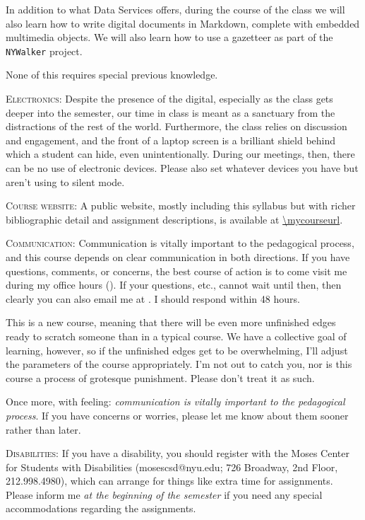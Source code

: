 \begin{description}
    In addition to what Data Services offers, during the course of the class we
    will also learn how to write digital documents in Markdown, complete with
    embedded multimedia objects. We will also learn how to use a gazetteer as
    part of the \texttt{NYWalker} project.

    None of this requires special previous knowledge.

  \item \textsc{Electronics:} Despite the presence of the digital, especially
    as the class gets deeper into the semester, our time in class is meant as a
    sanctuary from the distractions of the rest of the world. Furthermore, the
    class relies on discussion and engagement, and the front of a laptop screen
    is a brilliant shield behind which a student can hide, even
    unintentionally. During our meetings, then, there can be no use of
    electronic devices. Please also set whatever devices you have but aren’t
    using to silent mode.

  \item \textsc{Course website:} A public website, mostly including this
    syllabus but with richer bibliographic detail and assignment descriptions,
    is available at \url{\mycourseurl}.

  \item \textsc{Communication:} Communication is vitally important to the
    pedagogical process, and this course depends on clear communication in both
    directions. If you have questions, comments, or concerns, the best course
    of action is to come visit me during my office hours (\myofficehours). If
    your questions, etc., cannot wait until then, then clearly you can also
    email me at \texttt{\myemail}. I should respond within 48 hours.

    This is a new course, meaning that there will be even more unfinished edges
    ready to scratch someone than in a typical course. We have a collective
    goal of learning, however, so if the unfinished edges get to be
    overwhelming, I’ll adjust the parameters of the course appropriately. I’m
    not out to catch you, nor is this course a process of grotesque punishment.
    Please don’t treat it as such.

    Once more, with feeling: \textit{communication is vitally important to the
    pedagogical process}. If you have concerns or worries, please let me know
    about them sooner rather than later.

  \item \textsc{Disabilities:} If you have a disability, you should register
    with the Moses Center for Students with Disabilities (mosescsd@nyu.edu; 726
    Broadway, 2nd Floor, 212.998.4980), which can arrange for things like extra
    time for assignments. Please inform me \textit{at the beginning of the
      semester} if you need any special accommodations regarding the
    assignments.


\end{description}
